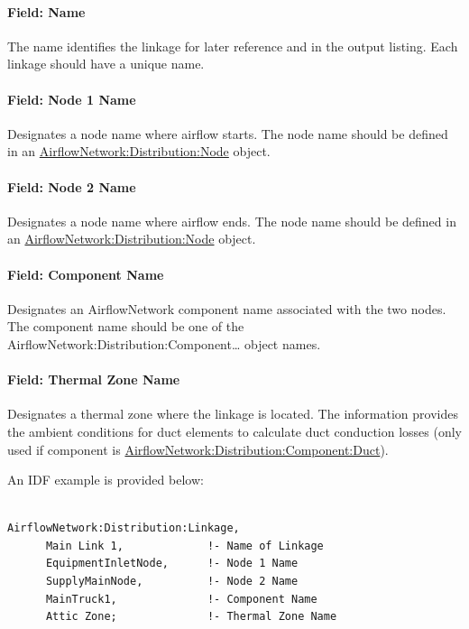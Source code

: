 \paragraph{Field: Name}\label{field-name-19}

The name identifies the linkage for later reference and in the output listing. Each linkage should have a unique name.

\paragraph{Field: Node 1 Name}\label{field-node-1-name-1}

Designates a node name where airflow starts. The node name should be defined in an \hyperref[airflownetworkdistributionnode]{AirflowNetwork:Distribution:Node} object.

\paragraph{Field: Node 2 Name}\label{field-node-2-name-1}

Designates a node name where airflow ends. The node name should be defined in an \hyperref[airflownetworkdistributionnode]{AirflowNetwork:Distribution:Node} object.

\paragraph{Field: Component Name}\label{field-component-name-1-000}

Designates an AirflowNetwork component name associated with the two nodes. The component name should be one of the AirflowNetwork:Distribution:Component\ldots{} object names.

\paragraph{Field: Thermal Zone Name}\label{field-thermal-zone-name}

Designates a thermal zone where the linkage is located. The information provides the ambient conditions for duct elements to calculate duct conduction losses (only used if component is \hyperref[airflownetworkdistributioncomponentduct]{AirflowNetwork:Distribution:Component:Duct}).

An IDF example is provided below:

\begin{lstlisting}

AirflowNetwork:Distribution:Linkage,
      Main Link 1,             !- Name of Linkage
      EquipmentInletNode,      !- Node 1 Name
      SupplyMainNode,          !- Node 2 Name
      MainTruck1,              !- Component Name
      Attic Zone;              !- Thermal Zone Name
\end{lstlisting}

